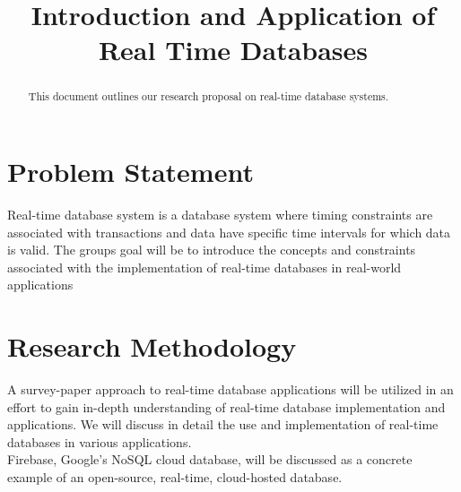 \documentclass[conference]{IEEEtran}
\begin{document}
\title{Introduction and Application of Real Time Databases}

\author{
\and
{}
\and
{}
}

\maketitle

\begin{abstract}
This document outlines our research proposal on real-time database systems.  
\end{abstract}


\section{Problem Statement}
Real-time database system is a database system where timing constraints are associated with transactions and data have specific time intervals for which data is valid. The groups goal will be to introduce the concepts and constraints associated with the implementation of real-time databases in real-world applications

\section{Research Methodology}
A survey-paper approach to real-time database applications will be utilized in an effort to gain in-depth understanding of real-time database implementation and applications. We will discuss in detail the use and implementation of real-time databases in various applications.\\
\indent Firebase, Google's NoSQL cloud database, will be discussed as a concrete example of an open-source, real-time, cloud-hosted database.
\end{document}

